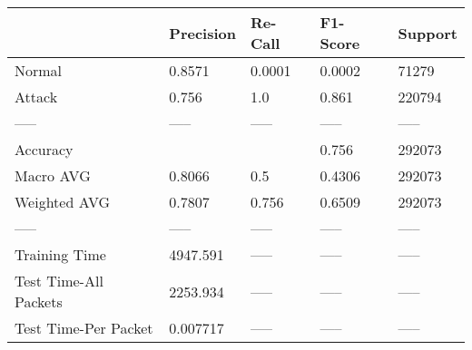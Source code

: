\begin{tabular}{lllll}
\toprule
{} & Precision & Re-Call & F1-Score & Support \\
\midrule
Normal                &    0.8571 &  0.0001 &   0.0002 &   71279 \\
Attack                &     0.756 &     1.0 &    0.861 &  220794 \\
-----                 &     ----- &   ----- &    ----- &   ----- \\
Accuracy              &           &         &    0.756 &  292073 \\
Macro AVG             &    0.8066 &     0.5 &   0.4306 &  292073 \\
Weighted AVG          &    0.7807 &   0.756 &   0.6509 &  292073 \\
-----                 &     ----- &   ----- &    ----- &   ----- \\
Training Time         &  4947.591 &   ----- &    ----- &   ----- \\
Test Time-All Packets &  2253.934 &   ----- &    ----- &   ----- \\
Test Time-Per Packet  &  0.007717 &   ----- &    ----- &   ----- \\
\bottomrule
\end{tabular}
